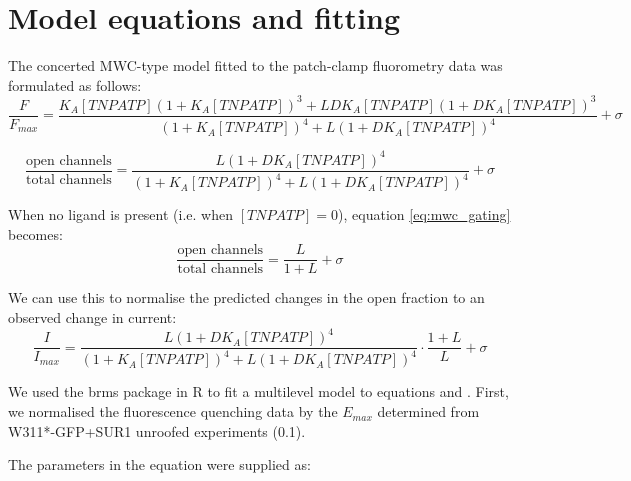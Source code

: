 \section{Model equations and fitting}

The concerted MWC-type model fitted to the patch-clamp fluorometry data was formulated as follows:
\begin{equation} \label{eq:mwc_binding}
\frac{F}{F_{max}} = \frac
    {K_A[TNPATP](1+K_A[TNPATP])^3+LDK_A[TNPATP](1+DK_A[TNPATP])^3}
    {(1+K_A[TNPATP])^4+L(1+DK_A[TNPATP])^4} + \sigma
\end{equation}

\begin{equation} \label{eq:mwc_gating}
\frac{\text{open channels}}{\text{total channels}} = \frac
    {L(1+DK_A[TNPATP])^4}
    {(1+K_A[TNPATP])^4+L(1+DK_A[TNPATP])^4} + \sigma
\end{equation}

When no ligand is present (i.e. when $[TNPATP] = 0$), equation \ref{eq:mwc_gating} becomes:
\begin{equation} \label{eq:intrinsic_po}
\frac{\text{open channels}}{\text{total channels}} = \frac
    {L}
    {1+L} + \sigma
\end{equation}

We can use this to normalise the predicted changes in the open fraction to an observed change in current:
\begin{equation} \label{eq:normalised_po}
\frac{I}{I_{max}} = \frac
    {L(1+DK_A[TNPATP])^4}
    {(1+K_A[TNPATP])^4+L(1+DK_A[TNPATP])^4}\cdot
   \frac
    {1+L}
    {L} + \sigma
\end{equation}

We used the brms package in R to fit a multilevel model to equations \label{eq:mwc_binding} and \label{eq:normalised_po}.
First, we normalised the fluorescence quenching data by the $E_{max}$ determined from W311*-GFP+SUR1 unroofed experiments (0.1).

The parameters in the equation were supplied as:

